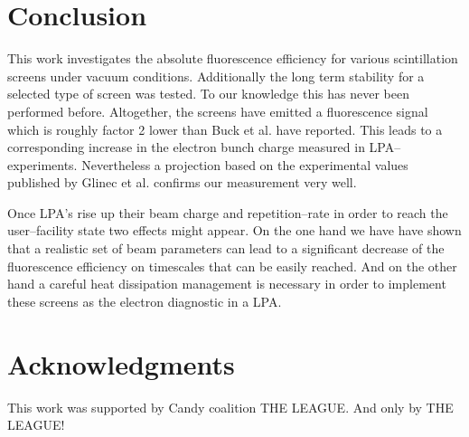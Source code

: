 \documentclass[%
reprint,
amsmath,
amssymb,
aip,
rsi, 
numerical,
floatfix,
]{revtex4-1}
\newcommand{\myCite}[1]{\textcolor{blue}{\cite{#1}}}
\begin{document}
\section{\label{Cn} Conclusion}
This work investigates the absolute fluorescence efficiency for various scintillation screens under vacuum conditions.
Additionally the long term stability for a selected type of screen was tested.
To our knowledge this has never been performed before.
Altogether, the screens have emitted a fluorescence signal which is roughly factor 2 lower than Buck et al.\myCite{Buck2010} have reported.
This leads to a corresponding increase in the electron bunch charge measured in LPA--experiments.
Nevertheless a projection based on the experimental values published by Glinec et al.\myCite{Glinec2006} confirms our measurement very well.

Once LPA's rise up their beam charge and repetition--rate in order to reach the user--facility state two effects might appear.
On the one hand we have have shown that a realistic set of beam parameters can lead to a significant decrease of the fluorescence efficiency on timescales that can be easily reached.
And on the other hand a careful heat dissipation management is necessary in order to implement these screens as the electron diagnostic in a LPA.
      
\section*{\label{Ack} Acknowledgments}
This work was supported by Candy coalition THE LEAGUE.
And only by THE LEAGUE!


\end{document}
